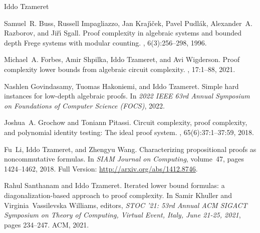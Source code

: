 \documentclass[report]{owrart}
\begin{document}
\begin{report}
\begin{talk}{Iddo Tzameret}
\begin{thebibliography}{99}
Samuel~R. Buss, Russell Impagliazzo, Jan Kraj{\'{\i}}{\v{c}}ek, Pavel
  Pudl{\'{a}}k, Alexander~A. Razborov, and Ji{\v{r}}{\'{\i}} Sgall.
\newblock Proof complexity in algebraic systems and bounded depth {F}rege
  systems with modular counting.
, 6(3):256--298, 1996.

Michael~A. Forbes, Amir Shpilka, Iddo Tzameret, and Avi Wigderson.
\newblock Proof complexity lower bounds from algebraic circuit complexity.
, 17:1--88, 2021.

Nashlen Govindasamy, Tuomas Hakoniemi, and Iddo Tzameret.
\newblock Simple hard instances for low-depth algebraic proofs.
\newblock In {\em 2022 IEEE 63rd Annual Symposium on Foundations of Computer
  Science (FOCS)}, 2022.

Joshua~A. Grochow and Toniann Pitassi.
\newblock Circuit complexity, proof complexity, and polynomial identity
  testing: The ideal proof system.
, 65(6):37:1--37:59, 2018.

Fu~Li, Iddo Tzameret, and Zhengyu Wang.
\newblock Characterizing propositional proofs as noncommutative formulas.
\newblock In {\em SIAM Journal on Computing}, volume~47, pages 1424--1462,
  2018.
\newblock Full Version: \url{http://arxiv.org/abs/1412.8746}.

Rahul Santhanam and Iddo Tzameret.
\newblock Iterated lower bound formulas: a diagonalization-based approach to
  proof complexity.
\newblock In Samir Khuller and Virginia~Vassilevska Williams, editors, {\em
  {STOC} '21: 53rd Annual {ACM} {SIGACT} Symposium on Theory of Computing,
  Virtual Event, Italy, June 21-25, 2021}, pages 234--247. {ACM}, 2021.

        
        \end{thebibliography}
        
        \end{talk}







\end{report}
\end{document}
